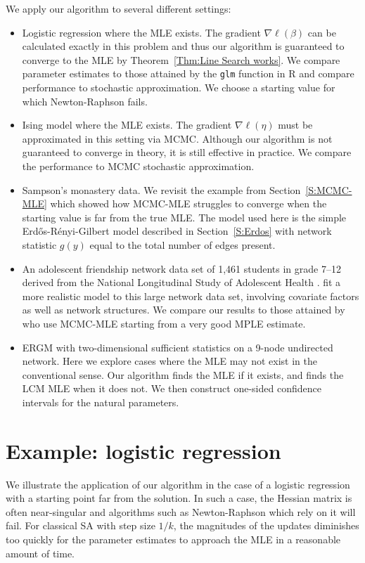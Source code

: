 We apply our algorithm to several different settings:
\begin{itemize}
\item Logistic regression where the MLE exists.  The gradient $\nabla \ell(\beta)$ can be calculated exactly in this problem and thus our algorithm is guaranteed to converge to
the MLE by Theorem~\ref{Thm:Line Search works}.  We compare parameter estimates to those attained by the \texttt{glm} function in R and compare performance to stochastic approximation.  We choose a starting value for which Newton-Raphson fails.

\item Ising model where the MLE exists.  The gradient $\nabla \ell(\eta)$ must be approximated in this setting via MCMC.  Although our algorithm is not guaranteed to converge in theory, it is still effective in practice.  
We compare the performance to MCMC stochastic approximation.

\item Sampson's monastery data.  We revisit the example from Section~\ref{S:MCMC-MLE} which
showed how MCMC-MLE struggles to converge when the starting value is far
from the true MLE.  The model used here is the simple Erd\H{o}s-R\'{e}nyi-Gilbert model 
described in Section~\ref{S:Erdos} with network statistic $g(y)$ equal to the total number of edges present.

\item An adolescent friendship network data set of 1,461 students in grade 7--12 derived 
from the National Longitudinal Study of Adolescent Health \citep*{Resnick:1997}.  \citet{statnet-tutorial}
fit a more realistic model to this large network data set, involving covariate
factors as well as network structures.  We compare our results to those attained by
\citeauthor{statnet-tutorial} who use MCMC-MLE starting from a very good MPLE estimate.

\item ERGM with two-dimensional sufficient statistics on a 9-node undirected network.  
Here we explore cases where the MLE may not exist in the conventional sense.  
Our algorithm finds the MLE if it exists, and finds the LCM MLE when 
it does not.  We then construct one-sided confidence intervals for the natural parameters.
\end{itemize}

\section{Example: logistic regression} \label{S:Example:logistic}
We illustrate the application of our algorithm in the case of a logistic regression 
with a starting point far from the 
solution.  In such a case, the Hessian matrix is often near-singular and algorithms 
such as Newton-Raphson which rely 
on it will fail.  For classical SA with step size $1/k$, the magnitudes of the updates 
diminishes too quickly for 
the parameter estimates to approach the MLE in a reasonable amount of time.

